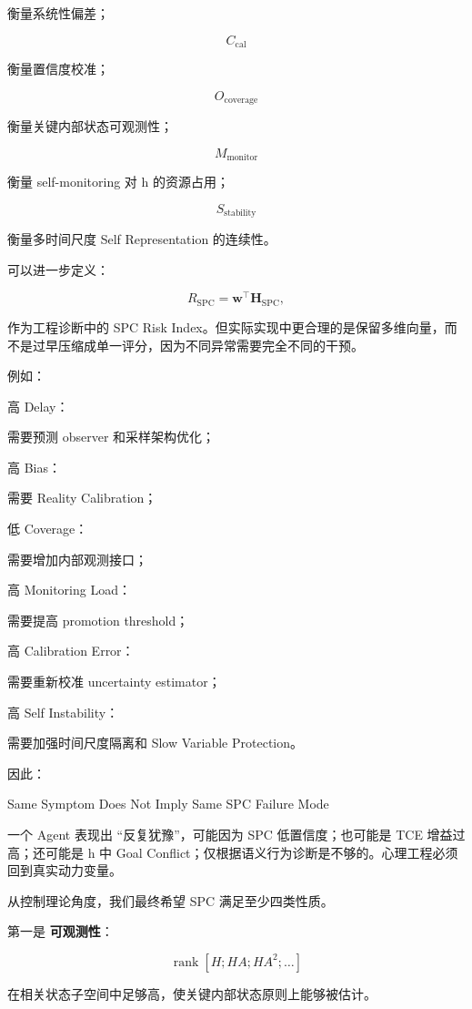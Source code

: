 衡量系统性偏差；

\[
C_{\mathrm{cal}}
\]

衡量置信度校准；

\[
O_{\mathrm{coverage}}
\]

衡量关键内部状态可观测性；

\[
M_{\mathrm{monitor}}
\]

衡量 self-monitoring 对 h 的资源占用；

\[
S_{\mathrm{stability}}
\]

衡量多时间尺度 Self Representation 的连续性。

可以进一步定义：

\[
R_{\mathrm{SPC}}
=
\mathbf w^\top
\mathbf H_{\mathrm{SPC}},
\]

作为工程诊断中的 SPC Risk Index。但实际实现中更合理的是保留多维向量，而不是过早压缩成单一评分，因为不同异常需要完全不同的干预。

例如：

高 Delay：

需要预测 observer 和采样架构优化；

高 Bias：

需要 Reality Calibration；

低 Coverage：

需要增加内部观测接口；

高 Monitoring Load：

需要提高 promotion threshold；

高 Calibration Error：

需要重新校准 uncertainty estimator；

高 Self Instability：

需要加强时间尺度隔离和 Slow Variable Protection。

因此：

\begin{statementbox}
Same Symptom Does Not Imply Same SPC Failure Mode
\end{statementbox}

一个 Agent 表现出 ``反复犹豫''，可能因为 SPC 低置信度；也可能是 TCE 增益过高；还可能是 h 中 Goal Conflict；仅根据语义行为诊断是不够的。心理工程必须回到真实动力变量。

从控制理论角度，我们最终希望 SPC 满足至少四类性质。

第一是 \textbf{可观测性}：

\[
\operatorname{rank}
\left[
H;
HA;
HA^2;
\ldots
\right]
\]

在相关状态子空间中足够高，使关键内部状态原则上能够被估计。

